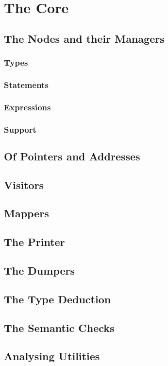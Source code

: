 \section{The Core}
\subsection{The Nodes and their Managers}
\subsubsection{Types}
\subsubsection{Statements}
\subsubsection{Expressions}
\subsubsection{Support}

\subsection{Of Pointers and Addresses}
\subsection{Visitors}
\subsection{Mappers}
\subsection{The Printer}
\subsection{The Dumpers}
\subsection{The Type Deduction}
\subsection{The Semantic Checks}
\subsection{Analysing Utilities}
